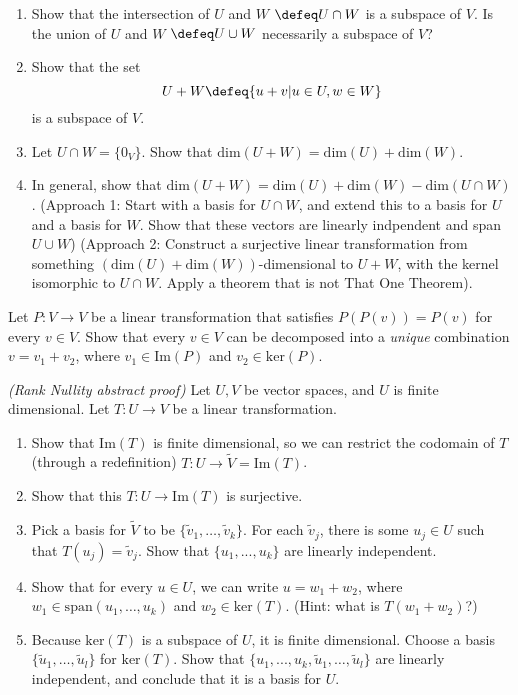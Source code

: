 \begin{exerciselist}
\begin{enumerate}[label=(\alph*)]
		\item Show that the intersection of $U$ and $W$ $\defeq U\cap W$ is a subspace of $V$. Is the union of $U$ and $W$ $\defeq U\cup W$ necessarily a subspace of $V$?
		\item Show that the set \[
			U+W \defeq \{u+v|u\in U, w\in W\}
		\]
		is a subspace of $V$.
		\item Let $U\cap W = \{0_V\}$. Show that $\textrm{dim}(U+ W) = \textrm{dim}(U)+\textrm{dim}(W)$.
		\item In general, show that $\textrm{dim}(U+ W) = \textrm{dim}(U)+\textrm{dim}(W) - \textrm{dim}(U\cap W)$. (Approach 1: Start with a basis for $U\cap W$, and extend this to a basis for $U$ and a basis for $W$. Show that these vectors are linearly indpendent and span $U\cup W$) (Approach 2: Construct a surjective linear transformation from something $(\textrm{dim}(U)+\textrm{dim}(W))$-dimensional to $U+ W$, with the kernel isomorphic to $U\cap W$. Apply a theorem that is not That One Theorem).
	\end{enumerate}
	\item Let $P:V\to V$ be a linear transformation that satisfies $P(P(v))=P(v)$ for every $v\in V$. Show that every $v\in V$ can be decomposed into a \textit{unique} combination $v=v_1+v_2$, where $v_1\in \textrm{Im}(P)$ and $v_2\in \textrm{ker}(P)$.  
	\item \textit{(Rank Nullity abstract proof)} Let $U,V$ be vector spaces, and $U$ is finite dimensional. Let $T:U\to V$ be a linear transformation. \begin{enumerate}[label=(\alph*)]
		\item Show that $\textrm{Im}(T)$ is finite dimensional, so we can restrict the codomain of $T$ (through a redefinition) $T:U\to \tilde{V}=\textrm{Im}(T)$.
		\item Show that this $T:U\to \textrm{Im}(T)$ is surjective.
		\item Pick a basis for $\tilde{V}$ to be $\{\tilde{v}_1,\ldots,\tilde{v}_k\}$. For each $\tilde{v}_j$, there is some $u_j\in U$ such that $T(u_j)=\tilde{v}_j$. Show that $\{u_1,...,u_k\}$ are linearly independent.
		\item Show that for every $u\in U$, we can write $u=w_1+w_2$, where $w_1\in \textrm{span}(u_1,\ldots,u_k)$ and $w_2\in \textrm{ker}(T)$. (Hint: what is $T(w_1+w_2)$?)
		\item Because $\textrm{ker}(T)$ is a subspace of $U$, it is finite dimensional. Choose a basis $\{\tilde{u}_1,\ldots, \tilde{u}_l\}$ for $\textrm{ker}(T)$. Show that  $\{u_1,...,u_k,\tilde{u}_1,\ldots, \tilde{u}_l\}$ are linearly independent, and conclude that it is a basis for $U$.

\end{enumerate}
\end{exerciselist}
